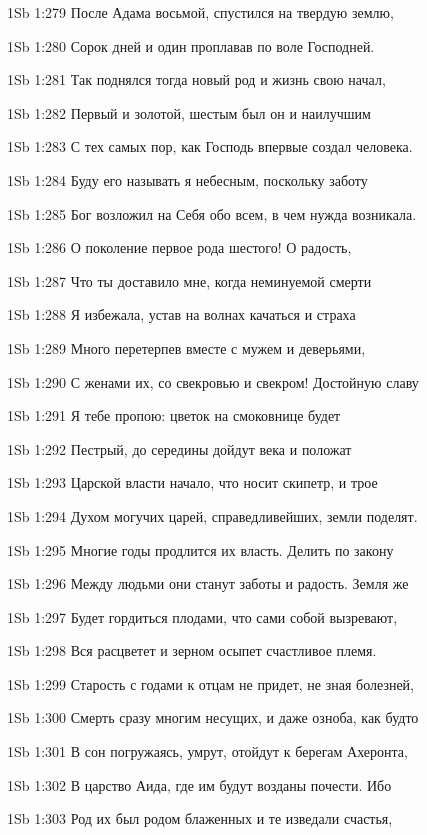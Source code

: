 \vs 1Sb 1:279 После Адама восьмой, спустился на твердую землю,

\vs 1Sb 1:280 Сорок дней и один проплавав по воле Господней.

\vs 1Sb 1:281 Так поднялся тогда новый род и жизнь свою начал,

\vs 1Sb 1:282 Первый и золотой, шестым был он и наилучшим

\vs 1Sb 1:283 С тех самых пор, как Господь впервые создал человека.

\vs 1Sb 1:284 Буду его называть я небесным, поскольку заботу

\vs 1Sb 1:285 Бог возложил на Себя обо всем, в чем нужда возникала.

\vs 1Sb 1:286 О поколение первое рода шестого! О радость,

\vs 1Sb 1:287 Что ты доставило мне, когда неминуемой смерти

\vs 1Sb 1:288 Я избежала, устав на волнах качаться и страха

\vs 1Sb 1:289 Много перетерпев вместе с мужем и деверьями,

\vs 1Sb 1:290 С женами их, со свекровью и свекром! Достойную славу

\vs 1Sb 1:291 Я тебе пропою: цветок на смоковнице будет

\vs 1Sb 1:292 Пестрый, до середины дойдут века и положат

\vs 1Sb 1:293 Царской власти начало, что носит скипетр, и трое

\vs 1Sb 1:294 Духом могучих царей, справедливейших, земли поделят.

\vs 1Sb 1:295 Многие годы продлится их власть. Делить по закону

\vs 1Sb 1:296 Между людьми они станут заботы и радость. Земля же

\vs 1Sb 1:297 Будет гордиться плодами, что сами собой вызревают,

\vs 1Sb 1:298 Вся расцветет и зерном осыпет счастливое племя.

\vs 1Sb 1:299 Старость с годами к отцам не придет, не зная болезней,

\vs 1Sb 1:300 Смерть сразу многим несущих, и даже озноба, как будто

\vs 1Sb 1:301 В сон погружаясь, умрут, отойдут к берегам Ахеронта,

\vs 1Sb 1:302 В царство Аида, где им будут возданы почести. Ибо

\vs 1Sb 1:303 Род их был родом блаженных и те изведали счастья,

